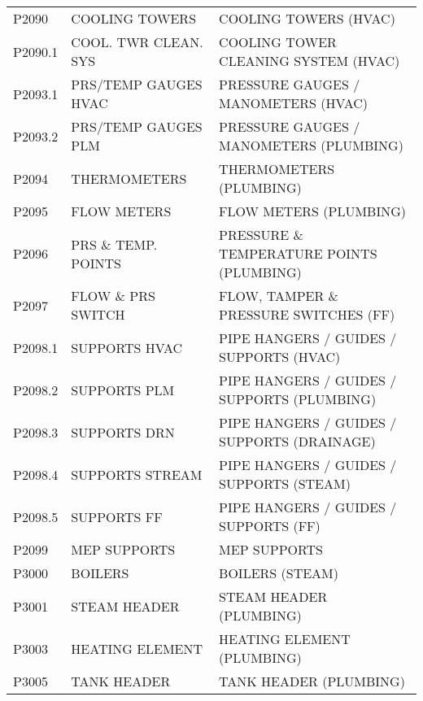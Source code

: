 \begin{longtable}[l]{l%
                  l|%
                  l|}
\rowcolor{thetableheadbgcolor!0.25!white} P2090       & COOLING TOWERS   & COOLING TOWERS (HVAC)   \\
\rowcolor{thetableheadbgcolor!0.25!white} P2090.1     & COOL. TWR CLEAN. SYS   & COOLING TOWER CLEANING SYSTEM (HVAC)   \\
\rowcolor{thetableheadbgcolor!0.25!white} P2093.1     & PRS/TEMP GAUGES HVAC   & PRESSURE GAUGES / MANOMETERS (HVAC)   \\
\rowcolor{thetableheadbgcolor!0.25!white} P2093.2     & PRS/TEMP GAUGES PLM   & PRESSURE GAUGES / MANOMETERS (PLUMBING)   \\
\rowcolor{thetableheadbgcolor!0.25!white} P2094       & THERMOMETERS   & THERMOMETERS (PLUMBING)   \\
\rowcolor{thetableheadbgcolor!0.25!white} P2095       & FLOW METERS   & FLOW METERS (PLUMBING)   \\
\rowcolor{thetableheadbgcolor!0.25!white} P2096       & PRS \& TEMP. POINTS   & PRESSURE \& TEMPERATURE POINTS (PLUMBING)   \\
\rowcolor{thetableheadbgcolor!0.25!white} P2097       & FLOW \& PRS SWITCH   & FLOW, TAMPER \& PRESSURE SWITCHES (FF)   \\
\rowcolor{thetableheadbgcolor!0.25!white} P2098.1     & SUPPORTS HVAC   & PIPE HANGERS / GUIDES / SUPPORTS (HVAC)   \\
\rowcolor{thetableheadbgcolor!0.25!white} P2098.2     & SUPPORTS PLM   & PIPE HANGERS / GUIDES / SUPPORTS (PLUMBING)   \\
\rowcolor{thetableheadbgcolor!0.25!white} P2098.3     & SUPPORTS DRN   & PIPE HANGERS / GUIDES / SUPPORTS (DRAINAGE)   \\
\rowcolor{thetableheadbgcolor!0.25!white} P2098.4     & SUPPORTS STREAM   & PIPE HANGERS / GUIDES / SUPPORTS (STEAM)   \\
\rowcolor{thetableheadbgcolor!0.25!white} P2098.5     & SUPPORTS FF   & PIPE HANGERS / GUIDES / SUPPORTS (FF)   \\
\rowcolor{thetableheadbgcolor!0.25!white} P2099       & MEP SUPPORTS   & MEP SUPPORTS   \\
\rowcolor{thetableheadbgcolor!0.25!white} P3000       & BOILERS   & BOILERS (STEAM)   \\
\rowcolor{thetableheadbgcolor!0.25!white} P3001       & STEAM HEADER   & STEAM HEADER (PLUMBING)   \\
\rowcolor{thetableheadbgcolor!0.25!white} P3003       & HEATING ELEMENT   & HEATING ELEMENT (PLUMBING)   \\
\rowcolor{thetableheadbgcolor!0.25!white} P3005       & TANK HEADER   & TANK HEADER (PLUMBING)   \\

\end{longtable}
